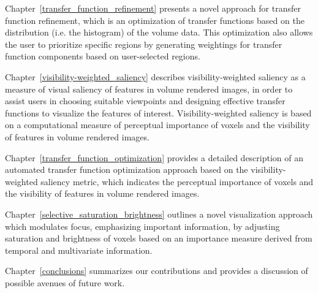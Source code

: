 Chapter~\ref{transfer_function_refinement}
presents a novel approach for transfer function refinement, which is an optimization of transfer functions based on the distribution (i.e. the histogram) of the volume data. This optimization also allows the user to prioritize specific regions by generating weightings for transfer function components based on user-selected regions.

Chapter~\ref{visibility-weighted_saliency}
describes visibility-weighted saliency as a measure of visual saliency of features in volume rendered images, in order to assist users in choosing suitable viewpoints and designing effective transfer functions to visualize the features of interest. Visibility-weighted saliency is based on a computational measure of perceptual importance of voxels and the visibility of features in volume rendered images.

Chapter~\ref{transfer_function_optimization}
provides a detailed description of an automated transfer function optimization approach based on the visibility-weighted saliency metric, which indicates the perceptual importance of voxels and the visibility of features in volume rendered images.

Chapter~\ref{selective_saturation_brightness}
outlines a novel visualization approach which modulates focus, emphasizing important information, by adjusting saturation and brightness of voxels based on an importance measure derived from temporal and multivariate information.

Chapter~\ref{conclusions}
summarizes our contributions and provides a discussion of possible avenues of future work.

%
%

